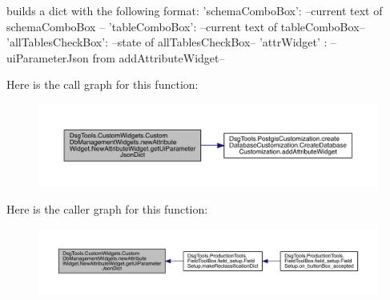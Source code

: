 \begin{DoxyVerb}builds a dict with the following format:
{
    'schemaComboBox': --current text of schemaComboBox --
    'tableComboBox': --current text of tableComboBox--
    'allTablesCheckBox': --state of allTablesCheckBox--
    'attrWidget' : -- uiParameterJson from addAttributeWidget--
}
\end{DoxyVerb}
 Here is the call graph for this function\+:
\nopagebreak
\begin{figure}[H]
\begin{center}
\leavevmode
\includegraphics[width=350pt]{class_dsg_tools_1_1_custom_widgets_1_1_custom_db_management_widgets_1_1new_attribute_widget_1_1_new_attribute_widget_a89327d724c4402d319a13ae069a8a18f_cgraph}
\end{center}
\end{figure}
Here is the caller graph for this function\+:
\nopagebreak
\begin{figure}[H]
\begin{center}
\leavevmode
\includegraphics[width=350pt]{class_dsg_tools_1_1_custom_widgets_1_1_custom_db_management_widgets_1_1new_attribute_widget_1_1_new_attribute_widget_a89327d724c4402d319a13ae069a8a18f_icgraph}
\end{center}
\end{figure}
\mbox{\label{class_dsg_tools_1_1_custom_widgets_1_1_custom_db_management_widgets_1_1new_attribute_widget_1_1_new_attribute_widget_a5e18f5473b9c2210a03b1b9afc55fb03}} 
